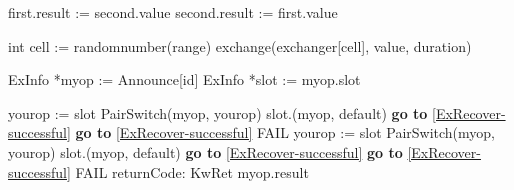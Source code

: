 \begin{figure*}
	
\begin{procedure}[H]
	\caption{void PairSwitch (ExInfo first, ExInfo second)}
	
	first.result := second.value \;
	second.result := first.value \;
	
\end{procedure}

\begin{procedure}[H]
	\caption{T visit (T value, int range, long duration)}
	
	int cell := randomnumber(range) \;
	\KwRet exchange(exchanger[cell], value, duration)
\end{procedure}

\begin{procedure}[H]
	\caption{T Exchanger-Recover (void)}
	
	ExInfo *myop := Announce[id] \;
	ExInfo *slot := myop.slot \;
	
	 {
		yourop := slot \;
		 {
		}
		 {
			PairSwitch(myop, yourop) \;
			slot.\CAS (myop, default) \;
			\textbf{go to} \ref{ExRecover-successful} \;
		}
		 {\textbf{go to} \ref{ExRecover-successful}}
		\KwRet FAIL	
	}
	 {
		yourop := slot \;
		 {
			PairSwitch(myop, yourop) \;
			slot.\CAS (myop, default) \;
			\textbf{go to} \ref{ExRecover-successful} \;
		}
		 {\textbf{go to} \ref{ExRecover-successful}}
		\KwRet FAIL	
	}
	returnCode:  \label{ExRecover-successful}
		{KwRet myop.result }
\end{procedure}

\caption{Elimination Array routines}
\end{figure*}



